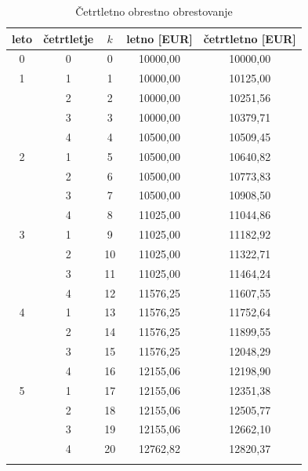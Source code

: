 \documentclass[12pt]{article}
\begin{document}
        \begin{longtable}{|c|c|c|c|c|}
            \hline
            \textbf{leto} & \textbf{četrtletje} & \textbf{$k$} & \textbf{letno [EUR]} & \textbf{četrtletno [EUR]} \\ \hline
            \endfirsthead
            \endhead
            0 & 0  & 0   & 10000,00 & 10000,00 \\ \hline \hline
            1 & 1  & 1   & 10000,00 & 10125,00 \\ \hline
              & 2  & 2   & 10000,00 & 10251,56 \\ \hline
              & 3  & 3   & 10000,00 & 10379,71 \\ \hline
              & 4  & 4   & 10500,00 & 10509,45 \\ \hline \hline
            2 & 1  & 5   & 10500,00 & 10640,82 \\ \hline 
              & 2  & 6   & 10500,00 & 10773,83 \\ \hline
              & 3  & 7   & 10500,00 & 10908,50 \\ \hline
              & 4  & 8   & 11025,00 & 11044,86 \\ \hline \hline
            3 & 1  & 9   & 11025,00 & 11182,92 \\ \hline 
              & 2  & 10  & 11025,00 & 11322,71 \\ \hline
              & 3  & 11  & 11025,00 & 11464,24 \\ \hline
              & 4  & 12  & 11576,25 & 11607,55 \\ \hline \hline
            4 & 1  & 13  & 11576,25 & 11752,64 \\ \hline 
              & 2  & 14  & 11576,25 & 11899,55 \\ \hline
              & 3  & 15  & 11576,25 & 12048,29 \\ \hline
              & 4  & 16  & 12155,06 & 12198,90 \\ \hline \hline
            5 & 1  & 17  & 12155,06 & 12351,38 \\ \hline 
              & 2  & 18  & 12155,06 & 12505,77 \\ \hline
              & 3  & 19  & 12155,06 & 12662,10 \\ \hline
              & 4  & 20  & 12762,82 & 12820,37 \\ \hline
            \caption{Četrtletno obrestno obrestovanje}
        \end{longtable}
\end{document}
